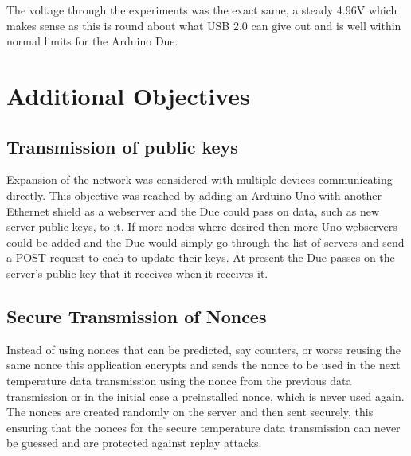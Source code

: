 The voltage through the experiments was the exact same, a steady 4.96V which makes sense as this is round about what USB 2.0 can give out and is well within normal limits for the Arduino Due.




\section{Additional Objectives}

\subsection{Transmission of public keys}

Expansion of the network was considered with multiple devices communicating directly. This objective was reached by adding an Arduino Uno with another Ethernet shield as a webserver and the Due could pass on data, such as new server public keys, to it. If more nodes where desired then more Uno webservers could be added and the Due would simply go through the list of servers and send a POST request to each to update their keys. At present the Due passes on the server's public key that it receives when it receives it. 

\subsection{Secure Transmission of Nonces}

Instead of using nonces that can be predicted, say counters, or worse reusing the same nonce this application encrypts and sends the nonce to be used in the next temperature data transmission using the nonce from the previous data transmission or in the initial case a preinstalled nonce, which is never used again. The nonces are created randomly on the server and then sent securely, this ensuring that the nonces for the secure temperature data transmission can never be guessed and are protected against replay attacks.

